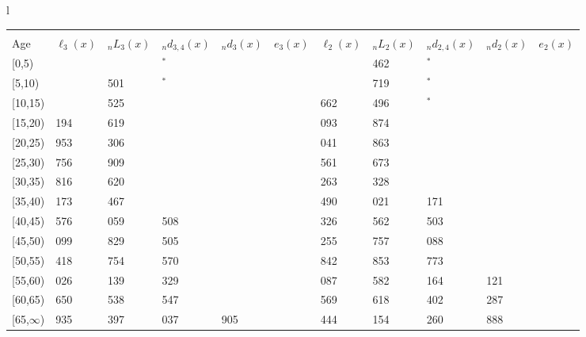 \documentclass[
]{article}
\begin{document}
\begin{table}
\centering
\begin{tabular}[t]{l}
\hline
\begin{tabular}{>{\raggedright\arraybackslash}p{.43in}>{\raggedleft\arraybackslash}p{.42in}>{\raggedleft\arraybackslash}p{.42in}>{\raggedleft\arraybackslash}p{.42in}>{\raggedleft\arraybackslash}p{.42in}>{\raggedleft\arraybackslash}p{.42in}>{\raggedleft\arraybackslash}p{.42in}>{\raggedleft\arraybackslash}p{.42in}>{\raggedleft\arraybackslash}p{.42in}>{\raggedleft\arraybackslash}p{.42in}>{\raggedleft\arraybackslash}p{.42in}}
\toprule
\multicolumn{1}{c}{ } & \multicolumn{5}{c}{(2) Lost mother only} & \multicolumn{5}{c}{(3) Lost father only} \\
\cmidrule(l{3pt}r{3pt}){2-6} \cmidrule(l{3pt}r{3pt}){7-11}
Age & $\ell_{3}(x)$ & ${}_nL_{3}(x)$ & ${}_nd_{3,4}(x)$ & ${}_nd_{3}(x)$ & $e_{3}(x)$ & $\ell_{2}(x)$ & ${}_nL_{2}(x)$ & ${}_nd_{2,4}(x)$ & ${}_nd_{2}(x)$ & $e_{2}(x)$\\
\midrule
{}[0,5) & 0 & 598 & 2$^{*}$ & 1 & 3 & 0 & 1 462 & 3$^{*}$ & 2 & 11\\
{}[5,10) & 354 & 2 501 & 22$^{*}$ & 0 & 3 & 767 & 5 719 & 20$^{*}$ & 1 & 11\\
{}[10,15) & 728 & 4 525 & 24 & 1 & 3 & 1 662 & 11 496 & 28$^{*}$ & 2 & 11\\
{}[15,20) & 1 194 & 7 619 & 117 & 4 & 3 & 3 093 & 19 874 & 69 & 10 & 10\\
{}[20,25) & 1 953 & 12 306 & 195 & 12 & 3 & 5 041 & 31 863 & 192 & 30 & 10\\
\addlinespace
{}[25,30) & 2 756 & 16 909 & 269 & 23 & 3 & 7 561 & 46 673 & 315 & 63 & 10\\
{}[30,35) & 3 816 & 23 620 & 557 & 42 & 3 & 10 263 & 64 328 & 783 & 116 & 10\\
{}[35,40) & 5 173 & 30 467 & 817 & 68 & 3 & 13 490 & 85 021 & 1 171 & 189 & 9\\
{}[40,45) & 6 576 & 39 059 & 1 508 & 107 & 2 & 17 326 & 108 562 & 2 503 & 298 & 8\\
{}[45,50) & 8 099 & 44 829 & 2 505 & 167 & 2 & 21 255 & 129 757 & 4 088 & 482 & 7\\
\addlinespace
{}[50,55) & 8 418 & 44 754 & 3 570 & 241 & 2 & 23 842 & 141 853 & 6 773 & 765 & 6\\
{}[55,60) & 8 026 & 40 139 & 4 329 & 325 & 1 & 24 087 & 138 582 & 9 164 & 1 121 & 5\\
{}[60,65) & 6 650 & 29 538 & 4 547 & 347 & 1 & 20 569 & 109 618 & 11 402 & 1 287 & 3\\
{}[65,$\infty$) & 3 935 & 35 397 & 7 037 & 1 905 & 0 & 12 444 & 165 154 & 25 260 & 8 888 & 2\\

\end{tabular}
\end{tabular}
\end{table}
\end{document}

